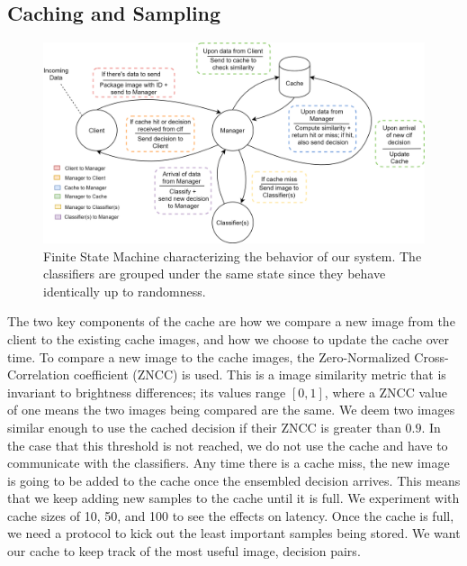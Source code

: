 \documentclass[12pt]{article}
\begin{document}
\subsection{Caching and Sampling}


\begin{figure}[t]
    \centering
    \includegraphics[scale=0.15]{FSM.png}
    \caption{Finite State Machine characterizing the behavior of our system. The classifiers are grouped under the same state since they behave identically up to randomness.}
    \label{fig:fsm}
\end{figure}

The two key components of the cache are how we compare a new image from the client to the existing cache images, and how we choose to update the cache over time. To compare a new image to the cache images, the Zero-Normalized Cross-Correlation coefficient (ZNCC) is used. This is a image similarity metric that is invariant to brightness differences; its values range $[0,1]$, where a ZNCC value of one means the two images being compared are the same. We deem two images similar enough to use the cached decision if their ZNCC is greater than $0.9$. In the case that this threshold is not reached, we do not use the cache and have to communicate with the classifiers. Any time there is a cache miss, the new image is going to be added to the cache once the ensembled decision arrives. This means that we keep adding new samples to the cache until it is full. We experiment with cache sizes of 10, 50, and 100 to see the effects on latency. Once the cache is full, we need a protocol to kick out the least important samples being stored. We want our cache to keep track of the most useful image, decision pairs. 
\end{document}
